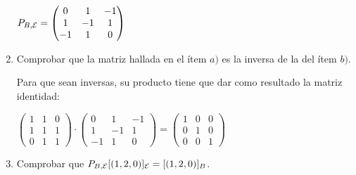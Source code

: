 \begin{enumerate}
\begin{mdframed}[style=s]
\begin{center}
                    $P_{B,\mathcal{E}}=\begin{pmatrix}
                        0&1&-1\\1&-1&1\\-1&1&0
                    \end{pmatrix}$
                \end{center}
            \end{mdframed}
        \item Comprobar que la matriz hallada en el ítem $a)$ es la inversa de la del ítem $b)$.
            \begin{mdframed}[style=s]
                Para que sean inversas, su producto tiene que dar como resultado la matriz identidad:
                \begin{center}
                    $\begin{pmatrix}
                        1&1&0\\1&1&1\\0&1&1
                    \end{pmatrix}\cdot\begin{pmatrix}
                        0&1&-1\\1&-1&1\\-1&1&0
                    \end{pmatrix}=\begin{pmatrix}
                        1&0&0\\0&1&0\\0&0&1
                    \end{pmatrix}$
                \end{center}
            \end{mdframed}
        \item Comprobar que $P_{B,\mathcal{E}}[(1,2,0)]_{\mathcal{E}}=[(1,2,0)]_B$.
\end{enumerate}
